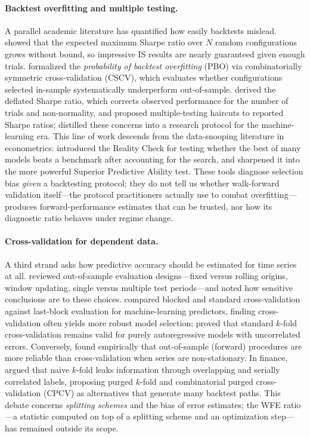 \documentclass[11pt]{article}
\begin{document}
\paragraph{Backtest overfitting and multiple testing.}
A parallel academic literature has quantified how easily backtests mislead.
\citet{bailey2014pseudomathematics} showed that the expected maximum Sharpe
ratio over $N$ random configurations grows without bound, so impressive IS
results are nearly guaranteed given enough trials. \citet{bailey2017probability}
formalized the \emph{probability of backtest overfitting} (PBO) via
combinatorially symmetric cross-validation (CSCV), which evaluates whether
configurations selected in-sample systematically underperform out-of-sample.
\citet{bailey2014deflated} derived the deflated Sharpe ratio, which corrects
observed performance for the number of trials and non-normality, and
\citet{harvey2015backtesting} proposed multiple-testing haircuts to reported
Sharpe ratios; \citet{arnott2019backtesting} distilled these concerns into a
research protocol for the machine-learning era. This line of work descends
from the data-snooping literature in econometrics: \citet{white2000reality}
introduced the Reality Check for testing whether the best of many models
beats a benchmark after accounting for the search, and \citet{hansen2005test}
sharpened it into the more powerful Superior Predictive Ability test. These
tools diagnose selection bias \emph{given} a backtesting protocol; they do not
tell us whether walk-forward validation itself---the protocol practitioners
actually use to combat overfitting---produces forward-performance estimates
that can be trusted, nor how its diagnostic ratio behaves under regime change.

\paragraph{Cross-validation for dependent data.}
A third strand asks how predictive accuracy should be estimated for time
series at all. \citet{tashman2000outofsample} reviewed out-of-sample
evaluation designs---fixed versus rolling origins, window updating, single
versus multiple test periods---and noted how sensitive conclusions are to
these choices. \citet{bergmeir2012use} compared blocked and standard
cross-validation against last-block evaluation for machine-learning
predictors, finding cross-validation often yields more robust model
selection; \citet{bergmeir2018note} proved that standard $k$-fold
cross-validation remains valid for purely autoregressive models with
uncorrelated errors. Conversely, \citet{cerqueira2020evaluating} found
empirically that out-of-sample (forward) procedures are more reliable than
cross-validation when series are non-stationary. In finance,
\citet{lopezdeprado2018advances} argued that naive $k$-fold leaks information
through overlapping and serially correlated labels, proposing purged $k$-fold
and combinatorial purged cross-validation (CPCV) as alternatives that
generate many backtest paths. This debate concerns \emph{splitting schemes}
and the bias of error estimates; the WFE ratio---a statistic computed on top
of a splitting scheme and an optimization step---has remained outside its
scope.
\end{document}
